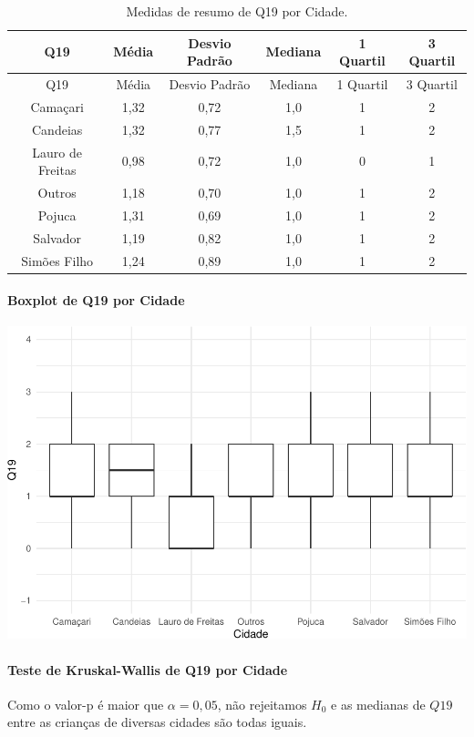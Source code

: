\documentclass[]{article}
\let\oldparagraph\paragraph
\renewcommand{\paragraph}[1]{\oldparagraph{#1}\mbox{}}
\begin{document}
\begin{longtable}[]{@{}cccccc@{}}
\caption{\label{tab:unnamed-chunk-253}Medidas de resumo de Q19 por Cidade.}\tabularnewline
\toprule
Q19 & Média & Desvio Padrão & Mediana & 1 Quartil & 3 Quartil\tabularnewline
\midrule
\endfirsthead
\toprule
Q19 & Média & Desvio Padrão & Mediana & 1 Quartil & 3 Quartil\tabularnewline
\midrule
\endhead
Camaçari & 1,32 & 0,72 & 1,0 & 1 & 2\tabularnewline
Candeias & 1,32 & 0,77 & 1,5 & 1 & 2\tabularnewline
Lauro de Freitas & 0,98 & 0,72 & 1,0 & 0 & 1\tabularnewline
Outros & 1,18 & 0,70 & 1,0 & 1 & 2\tabularnewline
Pojuca & 1,31 & 0,69 & 1,0 & 1 & 2\tabularnewline
Salvador & 1,19 & 0,82 & 1,0 & 1 & 2\tabularnewline
Simões Filho & 1,24 & 0,89 & 1,0 & 1 & 2\tabularnewline
\bottomrule
\end{longtable}

\hypertarget{boxplot-de-q19-por-cidade}{%
\paragraph{Boxplot de Q19 por Cidade}\label{boxplot-de-q19-por-cidade}}

\begin{center}\includegraphics[width=0.75\linewidth]{relatorio_files/figure-latex/unnamed-chunk-254-1} \end{center}

\hypertarget{teste-de-kruskal-wallis-de-q19-por-cidade}{%
\paragraph{Teste de Kruskal-Wallis de Q19 por Cidade}\label{teste-de-kruskal-wallis-de-q19-por-cidade}}

Como o valor-p é maior que \(\alpha=0,05\), não rejeitamos \(H_0\) e as medianas de \(Q19\) entre as crianças de diversas cidades são todas iguais.
\end{document}
